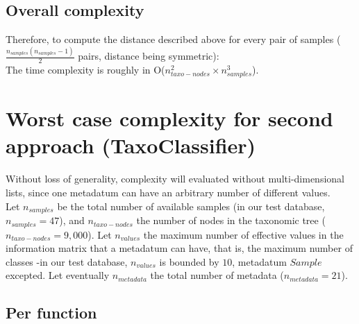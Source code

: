 \documentclass{report}
\begin{document}
\subsection{Overall complexity}

Therefore, to compute the distance described above for every pair of samples ($\frac{n_{samples}(n_{samples} - 1)}{2}$ pairs, distance being symmetric):\\

The time complexity is roughly in O($n_{taxo-nodes}^{2} \times n_{samples}^{3}$).

\section{Worst case complexity for second approach (TaxoClassifier)}

Without loss of generality, complexity will evaluated without multi-dimensional lists, since one metadatum can have an arbitrary number of different values.\\

Let $n_{samples}$ be the total number of available samples (in our test database, $n_{samples} = 47$), and $n_{taxo-nodes}$ the number of nodes in the taxonomic tree ($n_{taxo-nodes} = 9,000$). Let $n_{values}$ the maximum number of effective values in the information matrix that a metadatum can have, that is, the maximum number of classes -in our test database, $n_{values}$ is bounded by $10$, metadatum $Sample$ excepted. Let eventually $n_{metadata}$ the total number of metadata ($n_{metadata} = 21$). 

\subsection{Per function}
\end{document}
